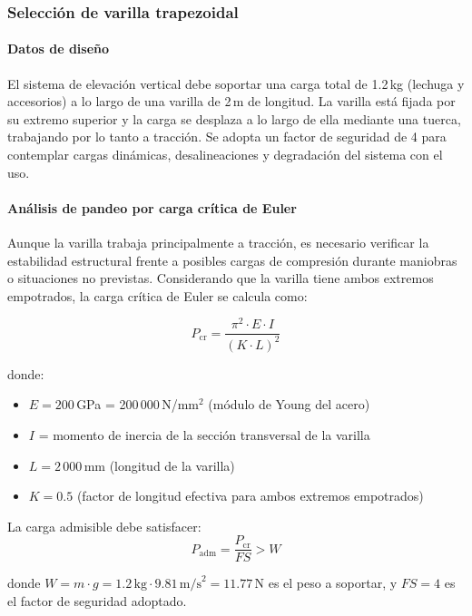 \subsubsection{Selección de varilla trapezoidal}

\paragraph{Datos de diseño}
El sistema de elevación vertical debe soportar una carga total de 1.2\,kg (lechuga y accesorios) a lo largo de una varilla de 2\,m de longitud. La varilla está fijada por su extremo superior y la carga se desplaza a lo largo de ella mediante una tuerca, trabajando por lo tanto a tracción. Se adopta un factor de seguridad de 4 para contemplar cargas dinámicas, desalineaciones y degradación del sistema con el uso.

\paragraph{Análisis de pandeo por carga crítica de Euler}
Aunque la varilla trabaja principalmente a tracción, es necesario verificar la estabilidad estructural frente a posibles cargas de compresión durante maniobras o situaciones no previstas. Considerando que la varilla tiene ambos extremos empotrados, la carga crítica de Euler se calcula como:

\begin{equation}
P_{\text{cr}} = \frac{\pi^2 \cdot E \cdot I}{(K \cdot L)^2}
\label{eq:euler_pandeo}
\end{equation}

donde:
\begin{itemize}
    \item $E = 200$\,GPa = 200\,000\,N/mm$^2$ (módulo de Young del acero)
    \item $I$ = momento de inercia de la sección transversal de la varilla
    \item $L = 2\,000$\,mm (longitud de la varilla)
    \item $K = 0.5$ (factor de longitud efectiva para ambos extremos empotrados)
\end{itemize}

La carga admisible debe satisfacer:
\begin{equation}
P_{\text{adm}} = \frac{P_{\text{cr}}}{FS} > W
\end{equation}

donde $W = m \cdot g = 1.2\,\text{kg} \cdot 9.81\,\text{m/s}^2 = 11.77$\,N es el peso a soportar, y $FS = 4$ es el factor de seguridad adoptado.

